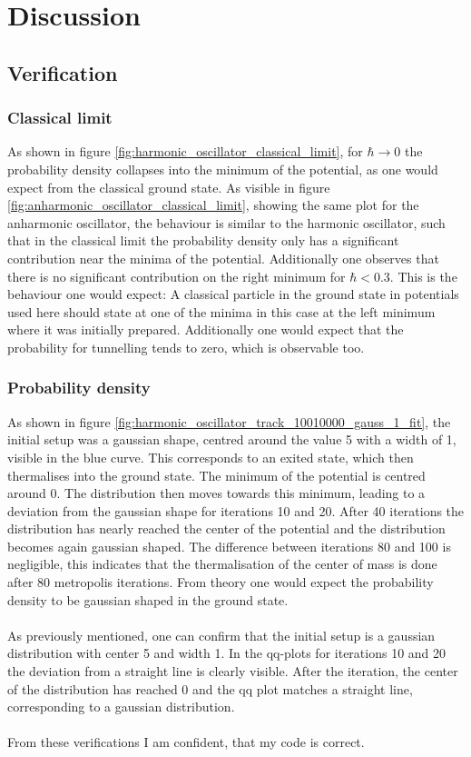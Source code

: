 \documentclass{scrartcl}
\begin{document}
	\section{Discussion}
	\subsection{Verification}
	\subsubsection{Classical limit}
		As shown in figure \ref{fig:harmonic_oscillator_classical_limit}, for $\hbar \rightarrow 0$ the probability density collapses into the minimum of the potential, as one would expect from the classical ground state.
		As visible in figure \ref{fig:anharmonic_oscillator_classical_limit}, showing the same plot for the anharmonic oscillator, the behaviour is similar to the harmonic oscillator, such that in the classical limit the probability density only has a significant contribution near the minima of the potential.
		Additionally one observes that there is no significant contribution on the right minimum for $\hbar < 0.3$.
		This is the behaviour one would expect:
		A classical particle in the ground state in potentials used here should state at one of the minima in this case at the left minimum where it was initially prepared.
		Additionally one would expect that the probability for tunnelling tends to zero, which is observable too.

	\subsubsection{Probability density}
		As shown in figure \ref{fig:harmonic_oscillator_track_10010000_gauss_1_fit}, the initial setup was a gaussian shape, centred around the value 5 with a width of 1, visible in the blue curve.
		This corresponds to an exited state, which then thermalises into the ground state.
		The minimum of the potential is centred around 0.
		The distribution then moves towards this minimum, leading to a deviation from the gaussian shape for iterations 10 and 20.
		After 40 iterations the distribution has nearly reached the center of the potential and the distribution becomes again gaussian shaped.
		The difference between iterations 80 and 100 is negligible, this indicates that the thermalisation of the center of mass is done after 80 metropolis iterations.
		From theory one would expect the probability density to be gaussian shaped in the ground state.
		\\\\
		As previously mentioned, one can confirm that the initial setup is a gaussian distribution with center 5 and width 1.
		In the qq-plots for iterations 10 and 20 the deviation from a straight line is clearly visible.
		After the  iteration, the center of the distribution has reached 0 and the qq plot matches a straight line, corresponding to a gaussian distribution.
		\\\\
		From these verifications I am confident, that my code is correct.
\end{document}

